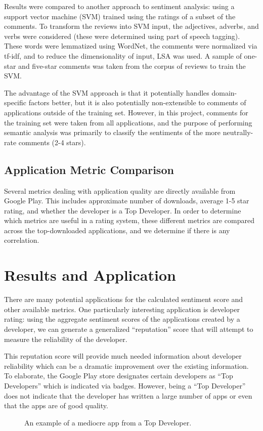 \documentclass{acm_proc_article-sp}
\begin{document}
Results were compared to another approach to sentiment analysis: using a support vector machine (SVM) trained using the ratings of a subset of the comments.  To transform the reviews into SVM input, the adjectives, adverbs, and verbs were considered (these were determined using part of speech tagging).  These words were lemmatized using WordNet, the comments were normalized via tf-idf, and to reduce the dimensionality of input, LSA was used.  A sample of one-star and five-star comments was taken from the corpus of reviews to train the SVM.

The advantage of the SVM approach is that it potentially handles domain-specific factors better, but it is also potentially non-extensible to comments of applications outside of the training set.  However, in this project, comments for the training set were taken from all applications, and the purpose of performing semantic analysis was primarily to classify the sentiments of the more neutrally-rate comments (2-4 stars).


\subsection{Application Metric Comparison}
Several metrics dealing with application quality are directly available from Google Play.  This includes approximate number of downloads, average 1-5 star rating, and whether the developer is a Top Developer.  In order to determine which metrics are useful in a rating system, these different metrics are compared across the top-downloaded applications, and we determine if there is any correlation.

\section{Results and Application}
There are many potential applications for the calculated sentiment score and other available metrics. One particularly interesting application is developer rating: using the aggregate sentiment scores of the applications created by a developer, we can generate a generalized ``reputation'' score that will attempt to measure the reliability of the developer.

This reputation score will provide much needed information about developer reliability which can be a dramatic improvement over the existing information. To elaborate, the Google Play store designates certain developers as ``Top Developers'' which is indicated via badges. However, being a ``Top Developer'' does not indicate that the developer has written a large number of apps or even that the apps are of good quality.
\begin{figure}[!h]
\centering
{}
\caption{An example of a mediocre app from a Top Developer.}
\label{fig:myfig}
\end{figure} 
\end{document}
